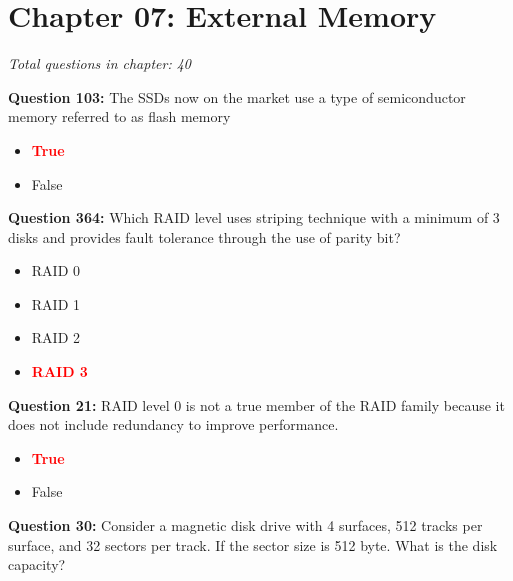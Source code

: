 \documentclass[12pt,a4paper]{article}
\begin{document}
\section{Chapter 07: External Memory}
\textit{Total questions in chapter: 40}

\textbf{Question 103:} The SSDs now on the market use a type of semiconductor memory referred to as flash memory

\begin{itemize}
    \item[\textbf{A.}] \textcolor{red}{\textbf{True}}
    \item[\textbf{B.}] False
\end{itemize}

\vspace{0.5cm}

\vspace{0.5cm}

\textbf{Question 364:} Which RAID level uses striping technique with a minimum of 3 disks and provides fault tolerance through the use of parity bit?

\begin{itemize}
    \item[\textbf{A.}] RAID 0
    \item[\textbf{B.}] RAID 1
    \item[\textbf{C.}] RAID 2
    \item[\textbf{D.}] \textcolor{red}{\textbf{RAID 3}}
\end{itemize}

\vspace{0.5cm}

\vspace{0.5cm}

\textbf{Question 21:} RAID level 0 is not a true member of the RAID family because it does not include redundancy to improve performance.

\begin{itemize}
    \item[\textbf{A.}] \textcolor{red}{\textbf{True}}
    \item[\textbf{B.}] False
\end{itemize}

\vspace{0.5cm}

\vspace{0.5cm}

\textbf{Question 30:} Consider a magnetic disk drive with 4 surfaces, 512 tracks per surface, and 32 sectors per track. If the sector size is 512 byte. What is the disk capacity?
\end{document}
